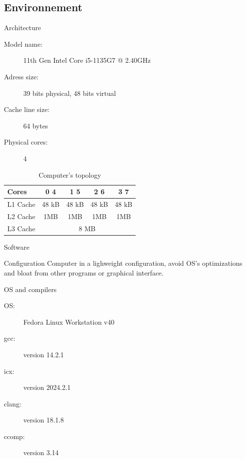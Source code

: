 \documentclass{beamer}
\begin{document}
    \subsection{Environnement}
    \begin{frame}{Architecture}
        \begin{block}{}
            \begin{description}
                \item[Model name: ] 11th Gen Intel Core i5-1135G7 @ 2.40GHz
                \item[Adress size: ] 39 bits physical, 48 bits virtual
                \item[Cache line size: ] 64 bytes
                \item[Physical cores: ] 4
            \end{description}
        \end{block}
        
        \begin{block}{}
            \begin{table}[H]
                \centering
                \begin{tabular}{|l|c|c|c|c|}
                    \hline
                    Cores & 0  4 & 1  5 & 2  6 & 3  7 \\
                    \hline
                    L1 Cache & 48 kB & 48 kB & 48 kB & 48 kB \\
                    \hline
                    L2 Cache & 1MB & 1MB & 1MB & 1MB \\
                    \hline
                    L3 Cache & \multicolumn{4}{|c|}{8 MB} \\
                    \hline
                \end{tabular}
                \caption{Computer's topology}
                \label{tab:graph_characteristics}
            \end{table}
        \end{block}
    \end{frame}
    
    
    \begin{frame}{Software}
        \begin{block}{Configuration}
            Computer in a lighweight configuration, avoid OS's optimizations and bloat from other programs or graphical interface.
        \end{block}
        \begin{block}{OS and compilers}
            \begin{description}
                \item[OS: ] Fedora Linux Workstation v40
                \item[gcc: ] version 14.2.1
                \item[icx: ] version 2024.2.1
                \item[clang: ] version 18.1.8
                \item[ccomp: ] version 3.14
            \end{description}
        \end{block}
    \end{frame}
    
\end{document}

